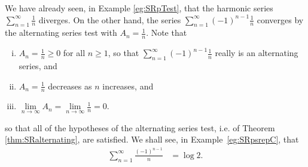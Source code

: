 \begin{eg}\label{eg:SRaltharmonic}
We have already seen, in Example \ref{eg:SRpTest}, that the harmonic
series $\sum_{n=1}^\infty\frac{1}{n}$ diverges. On the other hand, the
series $\sum_{n=1}^\infty(-1)^{n-1}\frac{1}{n}$ converges by the alternating
series test with $A_n=\frac{1}{n}$. Note that
\begin{enumerate}[(i)]\itemsep1pt \parskip0pt  %
\item $A_n=\frac{1}{n}\ge 0$ for all $n\ge 1$, so that
$\sum_{n=1}^\infty(-1)^{n-1}\frac{1}{n}$ really is an alternating series,
and
\item $A_n=\frac{1}{n}$ decreases as $n$ increases,  and
\item $\lim\limits_{n\rightarrow\infty}A_n
   =\lim\limits_{n\rightarrow\infty}\frac{1}{n}=0$.
\end{enumerate}
so that all of the hypotheses of the alternating series test,
i.e. of Theorem \ref{thm:SRalternating}, are satisfied. We shall see,
in Example~\ref{eg:SRpsrepC}, that
\begin{align*}
\sum_{n=1}^\infty \frac{(-1)^{n-1}}{n} &= \log 2.
\end{align*}
\end{eg}

